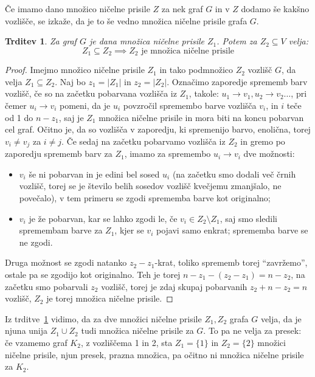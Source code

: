 \documentclass[12pt,a4paper,twoside]{article}
\theoremstyle{definition} %
\theoremstyle{plain} %
\newtheorem{trditev}[definicija]{Trditev}
\numberwithin{equation}{section}  %
\begin{document}
Če imamo dano množico ničelne prisile $Z$ za nek graf $G$ in v $Z$ dodamo še kakšno vozlišče, se izkaže, da je to še vedno množica ničelne prisile grafa $G$.
\begin{trditev}
    \label{trd:nadmnozica-zfs-je-zfs}
    Za graf $G$ je dana množica ničelne prisile $Z_1$. Potem za $Z_2 \subseteq V$ velja:
    \[ Z_1 \subseteq Z_2 \implies Z_2 \text{ je množica ničelne prisile} \]
\end{trditev}
\begin{proof}
    Imejmo množico ničelne prisile $Z_1$ in tako podmnožico $Z_2$ vozlišč $G$, da velja $Z_1 \subseteq Z_2$. Naj bo $z_1 = |Z_1|$ in $z_2 = |Z_2|$. Označimo zaporedje sprememb barv vozlišč, če so na začetku pobarvana vozlišča iz $Z_1$, takole: $u_1 \rightarrow v_1, u_2 \rightarrow v_2 \ldots$, pri čemer $u_i \rightarrow v_i$ pomeni, da je $u_i$ povzročil spremembo barve vozlišča $v_i$, in $i$ teče od 1 do $n - z_1$, saj je $Z_1$ množica ničelne prisile in mora biti na koncu pobarvan cel graf. Očitno je, da so vozlišča v zaporedju, ki spremenijo barvo, enolična, torej $v_i \neq v_j$ za $i \neq j$. Če sedaj na začetku pobarvamo vozlišča iz $Z_2$ in gremo po zaporedju sprememb barv za $Z_1$, imamo za spremembo $u_i \rightarrow v_i$ dve možnosti:
    \begin{itemize}
        \item $v_i$ še ni pobarvan in je edini bel sosed $u_i$ (na začetku smo dodali več črnih vozlišč, torej se je število belih sosedov vozlišč kvečjemu zmanjšalo, ne povečalo), v tem primeru se zgodi sprememba barve kot originalno;
        \item $v_i$ je že pobarvan, kar se lahko zgodi le, če $v_i \in Z_2 \setminus Z_1$, saj smo sledili spremembam barve za $Z_1$, kjer se $v_i$ pojavi samo enkrat; sprememba barve se ne zgodi.
    \end{itemize}
Druga možnost se zgodi natanko $z_2 - z_1$-krat, toliko sprememb torej ``zavržemo'', ostale pa se zgodijo kot originalno. Teh je torej $n - z_1 -(z_2 - z_1) = n - z_2$, na začetku smo pobarvali $z_2$ vozlišč, torej je zdaj skupaj pobarvanih $z_2 + n - z_2 = n$ vozlišč, $Z_2$ je torej množica ničelne prisile.
\end{proof}

Iz trditve~\ref{trd:nadmnozica-zfs-je-zfs} vidimo, da za dve množici ničelne prisile $Z_1, Z_2$ grafa $G$ velja, da je njuna unija $Z_1 \cup Z_2$ tudi množica ničelne prisile za $G$. To pa ne velja za presek: če vzamemo graf $K_2$, z vozliščema 1 in 2, sta $Z_1 = \{1\}$ in $Z_2 = \{2\}$ množici ničelne prisile, njun presek, prazna množica, pa očitno ni množica ničelne prisile za $K_2$.
\end{document}
